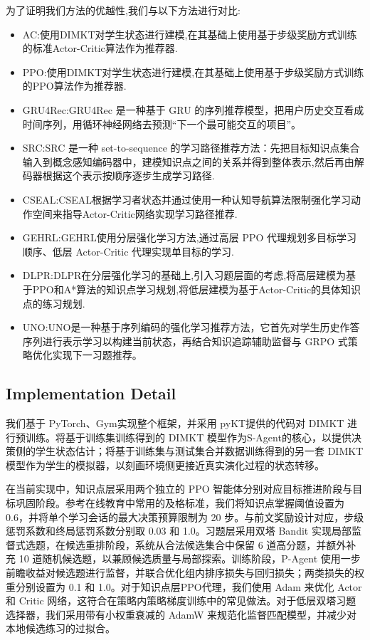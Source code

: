 \documentclass[11pt,a4paper]{article}
\begin{document}
为了证明我们方法的优越性,我们与以下方法进行对比:
\begin{itemize}
\item AC:使用DIMKT对学生状态进行建模,在其基础上使用基于步级奖励方式训练的标准Actor-Critic算法作为推荐器\cite{sutton1999policy}.
\item PPO:使用DIMKT对学生状态进行建模,在其基础上使用基于步级奖励方式训练的PPO算法作为推荐器\cite{schulman2017proximal}.
\item GRU4Rec:GRU4Rec 是一种基于 GRU 的序列推荐模型，把用户历史交互看成时间序列，用循环神经网络去预测“下一个最可能交互的项目”\cite{hidasi2015session}。
\item SRC:SRC 是一种 set-to-sequence 的学习路径推荐方法：先把目标知识点集合输入到概念感知编码器中，建模知识点之间的关系并得到整体表示,然后再由解码器根据这个表示按顺序逐步生成学习路径\cite{chen2023set}.
\item CSEAL:CSEAL根据学习者状态并通过使用一种认知导航算法限制强化学习动作空间来指导Actor-Critic网络实现学习路径推荐\cite{liu2019exploiting}.
\item GEHRL:GEHRL使用分层强化学习方法,通过高层 PPO 代理规划多目标学习顺序、低层 Actor-Critic 代理实现单目标的学习\cite{li2023graph}.
\item DLPR:DLPR在分层强化学习的基础上,引入习题层面的考虑,将高层建模为基于PPO和A*算法的知识点学习规划,将低层建模为基于Actor-Critic的具体知识点的练习规划\cite{zhang2024item}.
\item UNO:UNO是一种基于序列编码的强化学习推荐方法，它首先对学生历史作答序列进行表示学习以构建当前状态，再结合知识追踪辅助监督与 GRPO 式策略优化实现下一习题推荐\cite{peng2026uno}。
\end{itemize}

\subsection{Implementation Detail}
我们基于 PyTorch\cite{paszke2019pytorch}、Gym\cite{brockman2016openai}实现整个框架，并采用 pyKT提供的代码对 DIMKT 进行预训练。将基于训练集训练得到的 DIMKT 模型作为S-Agent的核心，以提供决策侧的学生状态估计；将基于训练集与测试集合并数据训练得到的另一套 DIMKT 模型作为学生的模拟器，以刻画环境侧更接近真实演化过程的状态转移。

在当前实现中，知识点层采用两个独立的 PPO 智能体分别对应目标推进阶段与目标巩固阶段。参考在线教育中常用的及格标准，我们将知识点掌握阈值设置为 0.6，并将单个学习会话的最大决策预算限制为 20 步。与前文奖励设计对应，步级惩罚系数和终局惩罚系数分别取 0.03 和 1.0。习题层采用双塔 Bandit 实现局部监督式选题，在候选重排阶段，系统从合法候选集合中保留 6 道高分题，并额外补充 10 道随机候选题，以兼顾候选质量与局部探索。训练阶段，P-Agent 使用一步前瞻收益对候选题进行监督，并联合优化组内排序损失与回归损失；两类损失的权重分别设置为 0.1 和 1.0。对于知识点层PPO代理，我们使用 Adam\cite{kingma2014adam} 来优化 Actor 和 Critic 网络，这符合在策略内策略梯度训练中的常见做法。对于低层双塔习题选择器，我们采用带有小权重衰减的 AdamW\cite{loshchilov2017decoupled} 来规范化监督匹配模型，并减少对本地候选练习的过拟合。
\end{document}
